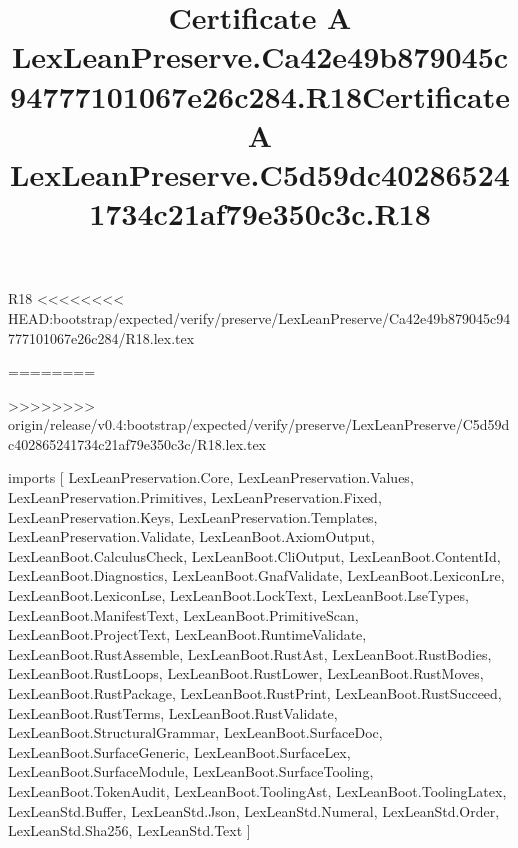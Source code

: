 \begin{lexlean}{R18}
<<<<<<<< HEAD:bootstrap/expected/verify/preserve/LexLeanPreserve/Ca42e49b879045c94777101067e26c284/R18.lex.tex
\title{Certificate A LexLeanPreserve.Ca42e49b879045c94777101067e26c284.R18}
========
\title{Certificate A LexLeanPreserve.C5d59dc402865241734c21af79e350c3c.R18}
>>>>>>>> origin/release/v0.4:bootstrap/expected/verify/preserve/LexLeanPreserve/C5d59dc402865241734c21af79e350c3c/R18.lex.tex
\begin{coremodule}
imports [
  LexLeanPreservation.Core,
  LexLeanPreservation.Values,
  LexLeanPreservation.Primitives,
  LexLeanPreservation.Fixed,
  LexLeanPreservation.Keys,
  LexLeanPreservation.Templates,
  LexLeanPreservation.Validate,
  LexLeanBoot.AxiomOutput,
  LexLeanBoot.CalculusCheck,
  LexLeanBoot.CliOutput,
  LexLeanBoot.ContentId,
  LexLeanBoot.Diagnostics,
  LexLeanBoot.GnafValidate,
  LexLeanBoot.LexiconLre,
  LexLeanBoot.LexiconLse,
  LexLeanBoot.LockText,
  LexLeanBoot.LseTypes,
  LexLeanBoot.ManifestText,
  LexLeanBoot.PrimitiveScan,
  LexLeanBoot.ProjectText,
  LexLeanBoot.RuntimeValidate,
  LexLeanBoot.RustAssemble,
  LexLeanBoot.RustAst,
  LexLeanBoot.RustBodies,
  LexLeanBoot.RustLoops,
  LexLeanBoot.RustLower,
  LexLeanBoot.RustMoves,
  LexLeanBoot.RustPackage,
  LexLeanBoot.RustPrint,
  LexLeanBoot.RustSucceed,
  LexLeanBoot.RustTerms,
  LexLeanBoot.RustValidate,
  LexLeanBoot.StructuralGrammar,
  LexLeanBoot.SurfaceDoc,
  LexLeanBoot.SurfaceGeneric,
  LexLeanBoot.SurfaceLex,
  LexLeanBoot.SurfaceModule,
  LexLeanBoot.SurfaceTooling,
  LexLeanBoot.TokenAudit,
  LexLeanBoot.ToolingAst,
  LexLeanBoot.ToolingLatex,
  LexLeanStd.Buffer,
  LexLeanStd.Json,
  LexLeanStd.Numeral,
  LexLeanStd.Order,
  LexLeanStd.Sha256,
  LexLeanStd.Text
]


\end{coremodule}
\end{lexlean}
